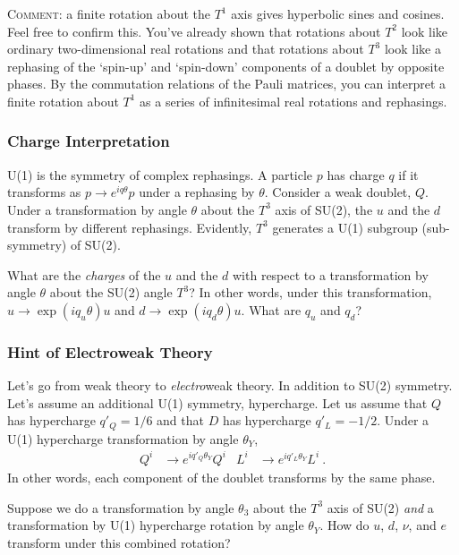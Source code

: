 \documentclass[12pt]{article}
\begin{document}
\textsc{Comment}: a finite rotation about the $T^1$ axis gives hyperbolic sines and cosines. Feel free to confirm this. You've already shown that rotations about $T^2$ look like ordinary two-dimensional real rotations and that rotations about $T^3$ look like a rephasing of the `spin-up' and `spin-down' components of a doublet by opposite phases. By the commutation relations of the Pauli matrices, you can interpret a finite rotation about $T^1$ as a series of infinitesimal real rotations and rephasings.

\subsubsection{Charge Interpretation}

U(1) is the symmetry of complex rephasings. A particle $p$ has charge $q$ if it transforms as $p \to e^{iq\theta} p$ under a rephasing by $\theta$. Consider a weak doublet, $Q$. Under a transformation by angle $\theta$ about the $T^3$ axis of SU(2), the $u$ and the $d$ transform by different rephasings. Evidently, $T^3$ generates a U(1) subgroup (sub-symmetry) of SU(2).

What are the \emph{charges} of the $u$ and the $d$ with respect to a transformation by angle $\theta$ about the SU(2) angle $T^3$? In other words, under this transformation, $u\to \exp(iq_u \theta) u$ and $d\to \exp(iq_d \theta) u$. What are $q_u$ and $q_d$?

\subsubsection{Hint of Electroweak Theory}

Let's go from weak theory to \emph{electro}weak theory. In addition to SU(2) symmetry. Let's assume an additional U(1) symmetry, hypercharge. Let us assume that $Q$ has hypercharge $q'_Q = 1/6$ and that $D$ has hypercharge $q'_L = -1/2$. Under a U(1) hypercharge transformation by angle $\theta_Y$,
\begin{align}
	Q^i &\to e^{iq'_Q \theta_Y} Q^i
	&
	L^i &\to e^{iq'_L \theta_Y} L^i \ .
\end{align}
In other words, each component of the doublet transforms by the same phase. 

Suppose we do a transformation by angle $\theta_3$ about the $T^3$ axis of SU(2) \emph{and} a transformation by U(1) hypercharge rotation by angle $\theta_Y$. How do $u$, $d$, $\nu$, and $e$ transform under this combined rotation?
\end{document}
